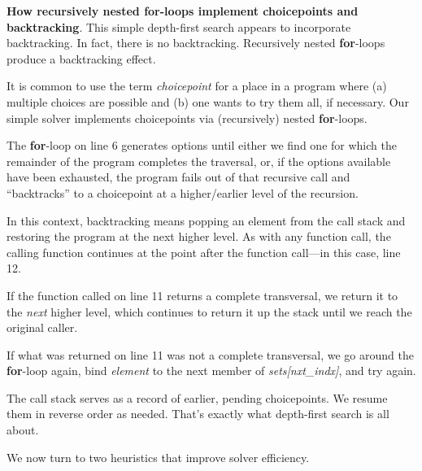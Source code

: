 \noindent\textbf{How recursively nested for-loops implement choicepoints and backtracking}. This simple depth-first search appears to incorporate backtracking. In fact, there is no backtracking. Recursively nested \textbf{for}-loops produce a backtracking effect.  

It is common to use the term \textit{choicepoint} for a place in a program where (a) multiple choices are possible and (b) one wants to try them all, if necessary. Our simple solver implements choicepoints via (recursively) nested \textbf{for}-loops. 

The \textbf{for}-loop on line 6 generates options until either we find one for which the remainder of the program completes the traversal, or, if the options available have been exhausted, the program fails out of that recursive call and ``backtracks'' to a choicepoint at a higher/earlier level of the recursion.

In this context, backtracking means popping an element from the call stack and restoring the program at the next higher level. As with any function call, the calling function continues at the point after the function call---in this case, line 12. 

If the function called on line 11 returns a complete transversal, we return it to the \textit{next} higher level, which continues to return it up the stack until we reach the original caller. 

If what was returned on line 11 was not a complete transversal, we go around the \textbf{for}-loop again, bind \textit{element} to the next member of \textit{sets[nxt\_indx]}, and try again. 

The call stack serves as a record of earlier, pending choicepoints. We resume them in reverse order as needed. That's exactly what depth-first search is all about.

\smallv
\noindent We now turn to two heuristics that improve solver efficiency. 

